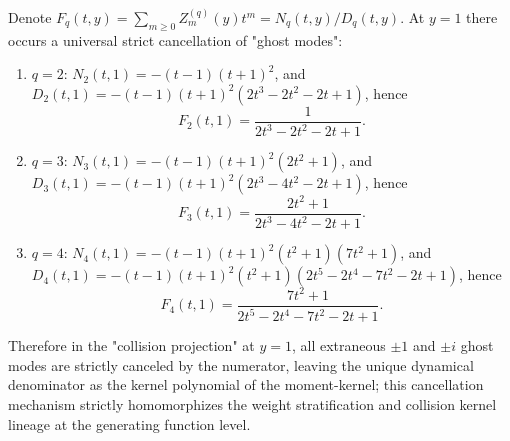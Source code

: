 \begin{remark}[Complete cancellation of ghost modes at \texorpdfstring{$y=1$}{y=1} and strict homomorphization of moment-kernel]\label{rem:xi-terminal-zq-ghost-cancellation-y1}
Denote \(F_q(t,y)=\sum_{m\ge 0}Z_m^{(q)}(y)t^m=N_q(t,y)/D_q(t,y)\).
At \(y=1\) there occurs a universal strict cancellation of "ghost modes":
\begin{enumerate}
  \item \(q=2\): \(N_2(t,1)=-(t-1)(t+1)^2\), and \(D_2(t,1)=-(t-1)(t+1)^2(2t^3-2t^2-2t+1)\), hence
  \[
  F_2(t,1)=\frac{1}{2t^3-2t^2-2t+1}.
  \]
  \item \(q=3\): \(N_3(t,1)=-(t-1)(t+1)^2(2t^2+1)\), and \(D_3(t,1)=-(t-1)(t+1)^2(2t^3-4t^2-2t+1)\), hence
  \[
  F_3(t,1)=\frac{2t^2+1}{2t^3-4t^2-2t+1}.
  \]
  \item \(q=4\): \(N_4(t,1)=-(t-1)(t+1)^2(t^2+1)(7t^2+1)\), and
  \(D_4(t,1)=-(t-1)(t+1)^2(t^2+1)(2t^5-2t^4-7t^2-2t+1)\), hence
  \[
  F_4(t,1)=\frac{7t^2+1}{2t^5-2t^4-7t^2-2t+1}.
  \]
\end{enumerate}
Therefore in the "collision projection" at \(y=1\), all extraneous \(\pm1\) and \(\pm i\) ghost modes are strictly canceled by the numerator,
leaving the unique dynamical denominator as the kernel polynomial of the moment-kernel; this cancellation mechanism strictly homomorphizes the weight stratification and collision kernel lineage at the generating function level.
\end{remark}

